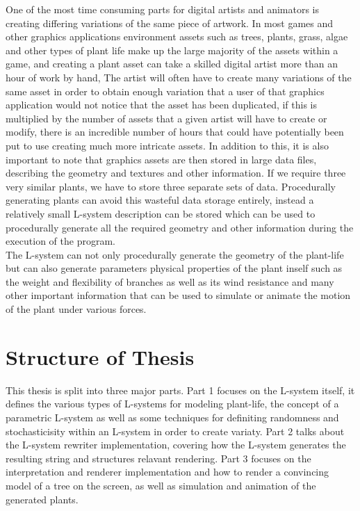 One of the most time consuming parts for digital artists and animators is creating differing variations of the same piece of artwork. In most games and other graphics applications environment assets such as trees, plants, grass, algae and other types of plant life make up the large majority of the assets within a game, and creating a plant asset can take a skilled digital artist more than an hour of work by hand, The artist will often have to create many variations of the same asset in order to obtain enough variation that a user of that graphics application would not notice that the asset has been duplicated, if this is multiplied by the number of assets that a given artist will have to create or modify, there is an incredible number of hours that could have potentially been put to use creating much more intricate assets. In addition to this, it is also important to note that graphics assets are then stored in large data files, describing the geometry and textures and other information. If we require three very similar plants, we have to store three separate sets of data. Procedurally generating plants can avoid this wasteful data storage entirely, instead a relatively small L-system description can be stored which can be used to procedurally generate all the required geometry and other information during the execution of the program.\\

The L-system can not only procedurally generate the geometry of the plant-life but can also generate parameters physical properties of the plant inself such as the weight and flexibility of branches as well as its wind resistance and many other important information that can be used to simulate or animate the motion of the plant under various forces. 

\section{Structure of Thesis}

This thesis is split into three major parts. Part 1 focuses on the L-system itself, it defines the various types of L-systems for modeling plant-life, the concept of a parametric L-system as well as some techniques for definiting randomness and stochasticisity within an L-system in order to create variaty. Part 2 talks about the L-system rewriter implementation, covering how the L-system generates the resulting string and structures relavant rendering. Part 3 focuses on the interpretation and renderer implementation and how to render a convincing model of a tree on the screen, as well as simulation and animation of the generated plants.





